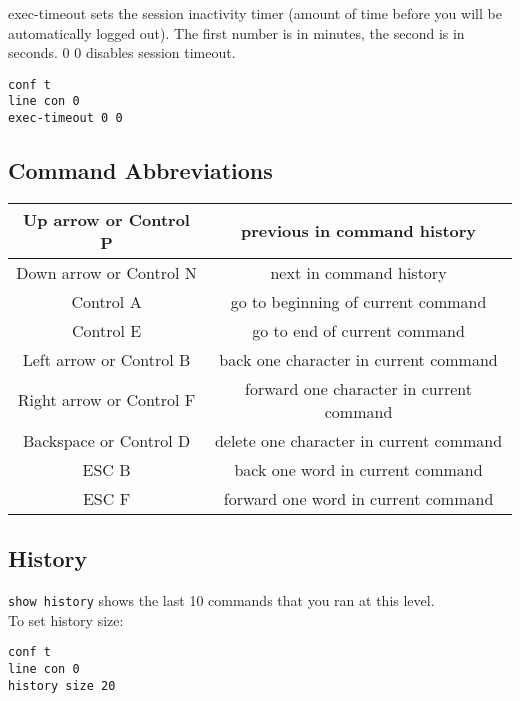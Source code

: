 exec-timeout sets the session inactivity timer (amount of time before you will
be automatically logged out). The first number is in minutes, the second
is in seconds. 0 0 disables session timeout.

\begin{verbatim}
conf t
line con 0
exec-timeout 0 0
\end{verbatim}

\subsection{Command Abbreviations}

\begin{tabular}{ | c | c | }
\hline
Up arrow or Control P & previous in command history \\ \hline
Down arrow or Control N & next in command history \\ \hline
Control A & go to beginning of current command \\ \hline
Control E & go to end of current command \\ \hline
Left arrow or Control B & back one character in current command \\ \hline
Right arrow or Control F & forward one character in current command \\ \hline
Backspace or Control D & delete one character in current command \\ \hline
ESC B & back one word in current command \\ \hline
ESC F & forward one word in current command \\ \hline
\end{tabular}

\subsection{History}

\texttt{show history} shows the last 10 commands that you ran at this level.\\

To set history size:

\begin{verbatim}
conf t
line con 0
history size 20
\end{verbatim}

